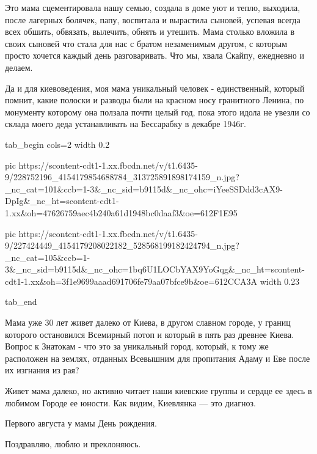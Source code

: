 Это мама сцементировала нашу семью, создала в доме уют и тепло, выходила, после
лагерных болячек, папу, воспитала и вырастила сыновей, успевая всегда всех
обшить, обвязать, вылечить, обнять и утешить. Мама столько вложила в своих
сыновей что стала для нас с братом незаменимым другом, с которым просто хочется
каждый день разговаривать. Что мы, хвала Скайпу, ежедневно и делаем. 

Да и для киевоведения, моя мама уникальный человек - единственный, который
помнит, какие полоски и разводы были на красном носу гранитного Ленина, по
монументу которому она ползала почти целый год, пока этого идола не увезли со
склада моего деда устанавливать на Бессарабку в декабре 1946г.  

\ifcmt
  tab_begin cols=2
    width 0.2

     pic https://scontent-cdt1-1.xx.fbcdn.net/v/t1.6435-9/228752196_4154179854688784_313725891898174159_n.jpg?_nc_cat=101&ccb=1-3&_nc_sid=b9115d&_nc_ohc=iYeeSSDdd3cAX9-DpIg&_nc_ht=scontent-cdt1-1.xx&oh=47626759aec4b240a61d1948bc0daaf3&oe=612F1E95

     pic https://scontent-cdt1-1.xx.fbcdn.net/v/t1.6435-9/227424449_4154179208022182_528568199182424794_n.jpg?_nc_cat=105&ccb=1-3&_nc_sid=b9115d&_nc_ohc=1bq6U1LOCbYAX9YoGqg&_nc_ht=scontent-cdt1-1.xx&oh=3f1e9699aaad691706fe79aa07bfce9b&oe=612CCA3A
    width 0.23

  tab_end
\fi

Мама уже 30 лет живет далеко от Киева, в другом славном городе, у границ
которого остановился Всемирный потоп и который в пять раз древнее Киева. Вопрос
к Знатокам - что это за уникальный город, который, к тому же расположен на
землях, отданных Всевышним для пропитания Адаму и Еве после их изгнания из рая?

Живет мама далеко, но активно читает наши киевские группы и сердце ее здесь в
любимом Городе ее юности. Как видим, Киевлянка — это диагноз.

Первого августа у мамы День рождения.

Поздравляю, люблю и преклоняюсь.
